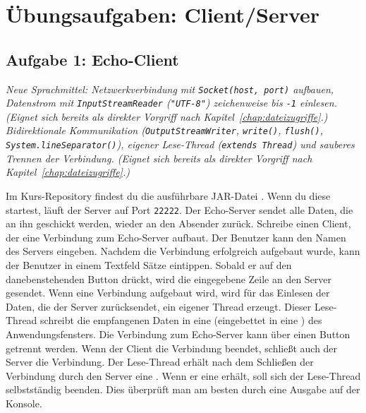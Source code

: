 \clearpage

\rehead[]{\textcolor{lightblue}{AvHG, Inf, My}}
\lohead[]{\textcolor{lightblue}{AvHG, Inf, My}}

\section{Übungsaufgaben: Client/Server}

\subsection{Aufgabe 1: Echo-Client \tagLK}
\noindent \emph{Neue Sprachmittel: Netzwerkverbindung mit \texttt{Socket(host, port)} aufbauen, Datenstrom mit \texttt{InputStreamReader} (\texttt{"UTF-8"}) zeichenweise bis \texttt{-1} einlesen. (Eignet sich bereits als direkter Vorgriff nach Kapitel~\ref{chap:dateizugriffe}.) Bidirektionale Kommunikation (\texttt{OutputStreamWriter}, \texttt{write()}, \texttt{flush()}, \texttt{System.lineSeparator()}), eigener Lese-Thread (\texttt{extends Thread}) und sauberes Trennen der Verbindung. (Eignet sich bereits als direkter Vorgriff nach Kapitel~\ref{chap:dateizugriffe}.)}

Im Kurs-Repository findest du die ausführbare JAR-Datei
. Wenn du diese startest, läuft der Server auf Port
\lstinline|22222|. Der Echo-Server sendet alle Daten, die an ihn geschickt
werden, wieder an den Absender zurück. Schreibe einen Client, der eine
Verbindung zum Echo-Server aufbaut. Der Benutzer kann den Namen des Servers
eingeben. Nachdem die Verbindung erfolgreich aufgebaut wurde, kann der Benutzer
in einem Textfeld Sätze eintippen. Sobald er auf den danebenstehenden Button
drückt, wird die eingegebene Zeile an den Server gesendet. Wenn eine Verbindung
aufgebaut wird, wird für das Einlesen der Daten, die der Server zurücksendet,
ein eigener Thread erzeugt. Dieser Lese-Thread schreibt die empfangenen Daten
in eine  (eingebettet in eine ) des
Anwendungsfensters. Die Verbindung zum Echo-Server kann über
einen Button getrennt werden. Wenn der Client die Verbindung beendet, schließt
auch der Server die Verbindung. Der Lese-Thread erhält nach dem Schließen der
Verbindung durch den Server eine . Wenn er eine
 erhält, soll sich der Lese-Thread selbstständig beenden.
Dies überprüft man am besten durch eine Ausgabe auf der Konsole.

